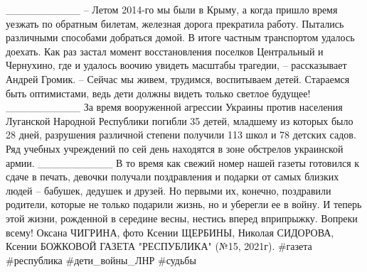 __________
– Летом 2014-го мы были в Крыму, а когда пришло время уезжать по обратным билетам, железная дорога прекратила работу. Пытались различными способами добраться домой. В итоге частным транспортом удалось доехать. Как раз застал момент восстановления поселков Центральный и Чернухино, где и удалось воочию увидеть масштабы трагедии, – рассказывает Андрей Громик.
 – Сейчас мы живем, трудимся, воспитываем детей. Стараемся быть оптимистами, ведь дети должны видеть только светлое будущее!
__________
За время вооруженной агрессии Украины против населения Луганской Народной Республики погибли 35 детей, младшему из которых было 28 дней, разрушения различной степени получили 113 школ и 78 детских садов. Ряд учебных учреждений по сей день находятся в зоне обстрелов украинской армии. 
__________
В то время как свежий номер нашей газеты готовился к сдаче в печать, девочки получали поздравления и подарки от самых близких людей – бабушек, дедушек и друзей. Но первыми их, конечно, поздравили родители, которые не только подарили жизнь, но и уберегли ее в войну. И теперь этой жизни, рожденной в середине весны, нестись вперед вприпрыжку. Вопреки всему!
Оксана ЧИГРИНА, 
фото Ксении ЩЕРБИНЫ, Николая СИДОРОВА, Ксении БОЖКОВОЙ
ГАЗЕТА "РЕСПУБЛИКА" (№15, 2021г).
#газета #республика #дети_войны_ЛНР #судьбы
